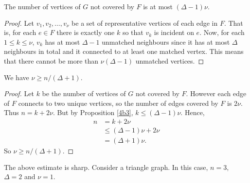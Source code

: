 \documentclass{unswmaths}
\begin{document}
\begin{proposition}
\label{4b3}
The number of vertices of $G$ not covered by $F$ is at most $(\Delta-1)\nu$.
\end{proposition}
\begin{proof}
    Let $v_1,v_2,\ldots,v_\nu$ be a set of representative vertices
    of each edge in $F$. That is, for each $e \in F$ there
    is exactly one $k$ so that $v_k$ is incident on $e$. 
    Now, for each $1 \leq k \leq \nu$, $v_k$ has at most $\Delta - 1$
    unmatched neighbours since it has at most $\Delta$ neighbours in total
    and it connected to at least one matched vertex. This means that there cannot be more
    than $\nu(\Delta-1)$ unmatched vertices. 
\end{proof}
\begin{proposition}[Part (b) iv]
\label{4b4}
We have $\nu \geq n/(\Delta+1)$.
\end{proposition}
\begin{proof}
    Let $k$ be the number of vertices of $G$ not covered by $F$.
    However each edge of $F$ connects to two unique vertices, so the number
    of edges covered by $F$ is $2\nu$.
    Thus
    $n = k+2\nu$. But by Proposition \ref{4b3}, $k \leq (\Delta-1)\nu$.
    Hence,
    \begin{align}
        n &= k+2\nu\\
        &\leq (\Delta-1)\nu+2\nu\\
        &= (\Delta+1)\nu.
    \end{align}
    So $\nu \geq n/(\Delta+1)$.
\end{proof}

\begin{remark}
    The above estimate is sharp. Consider a triangle graph. 
    In this case, $n = 3$, $\Delta = 2$ and $\nu = 1$.
\end{remark}
\end{document}
